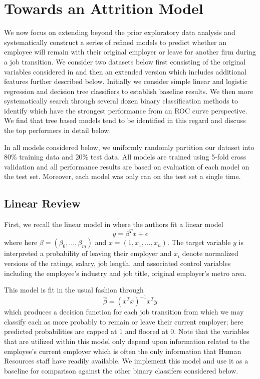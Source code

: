 \documentclass[10pt]{article}
\begin{document}
\section{Towards an Attrition Model}

We now focus on extending beyond the prior exploratory data analysis and systematically construct 
a series of refined models to predict whether an employee will remain with their original employer or 
leave for another firm during a job transition.  We consider two datasets below first 
consisting of the original variables considered in \cite{Smart2016} and then an extended 
version which includes additional features further described below. Initially we 
consider simple linear and logistic regression and decision tree classifiers to establish 
baseline results.  We then more systematically search through several dozen binary classification 
methods to identify which have the strongest performance from an ROC curve perspective.  We find 
that tree based models tend to be identified in this regard and discuss the top performers 
in detail below. 

In all models considered below, we uniformly randomly partition our dataset into 80\% training data 
and 20\% test data.  All models are trained using 5-fold cross validation and all performance 
results are based on evaluation of each model on the test set.  Moreover, each model 
was only ran on the test set a single time. 

\subsection{Linear Review}
First, we recall the linear model in \cite{Smart2016} where the authors fit a linear model 
%
\begin{equation} 
    y = \beta^Tx + \epsilon 
\end{equation} 
% 
where here $\beta = (\beta_0,\ldots,\beta_m)$ and $x=(1,x_1,\ldots,x_{n})$. The 
target variable $y$ is interpreted a probability of leaving their employer and 
$x_i$ denote normalized versions of the ratings, salary, job length, and 
associated control variables including the employee's industry and job title, original 
employer's metro area.

This model is fit in the usual fashion through 
%
\begin{equation}
    \hat{\beta} = (x^Tx)^{-1}x^Ty
\end{equation}
%
which produces a decision function for each job transition from which we may classify 
each as more probably to remain or leave their current employer; here predicted probabilities 
are capped at 1 and floored at 0. Note that the variables 
that are utilized within this model only depend upon information related to the employee's 
current employer which is often the only information that Human Resources staff have 
readily available.  We implement this model and use it as a baseline for comparison against the other
binary classifers considered below. 
\end{document}
